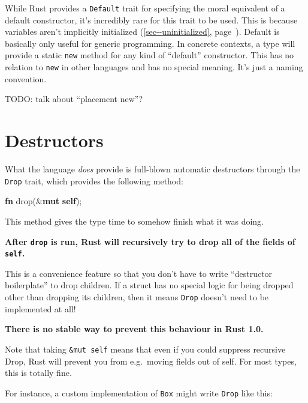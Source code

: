 \documentclass[a4paper,]{book}
\renewcommand*{\hyperref}[2][\ar]{%
  \def\ar{#2}%
  #2 (\autoref{#1}, page~\pageref{#1})}
\newenvironment{Shaded}{\begin{snugshade}}{\end{snugshade}}
\newcommand{\KeywordTok}[1]{\textcolor[rgb]{0.13,0.29,0.53}{\textbf{{#1}}}}
\newcommand{\NormalTok}[1]{{#1}}
\begin{document}
While Rust provides a \texttt{Default} trait for specifying the moral
equivalent of a default constructor, it's incredibly rare for this trait
to be used. This is because variables
\hyperref[sec--uninitialized]{aren't implicitly initialized}. Default is
basically only useful for generic programming. In concrete contexts, a
type will provide a static \texttt{new} method for any kind of
``default'' constructor. This has no relation to \texttt{new} in other
languages and has no special meaning. It's just a naming convention.

TODO: talk about ``placement new''?

\section{Destructors}\label{sec--destructors}

What the language \emph{does} provide is full-blown automatic
destructors through the \texttt{Drop} trait, which provides the
following method:

\begin{Shaded}
\begin{Highlighting}[]
\KeywordTok{fn} \NormalTok{drop(&}\KeywordTok{mut} \KeywordTok{self}\NormalTok{);}
\end{Highlighting}
\end{Shaded}

This method gives the type time to somehow finish what it was doing.

\textbf{After \texttt{drop} is run, Rust will recursively try to drop
all of the fields of \texttt{self}.}

This is a convenience feature so that you don't have to write
``destructor boilerplate'' to drop children. If a struct has no special
logic for being dropped other than dropping its children, then it means
\texttt{Drop} doesn't need to be implemented at all!

\textbf{There is no stable way to prevent this behaviour in Rust 1.0.}

Note that taking \texttt{\&mut\ self} means that even if you could
suppress recursive Drop, Rust will prevent you from e.g.~moving fields
out of self. For most types, this is totally fine.

For instance, a custom implementation of \texttt{Box} might write
\texttt{Drop} like this:
\end{document}
